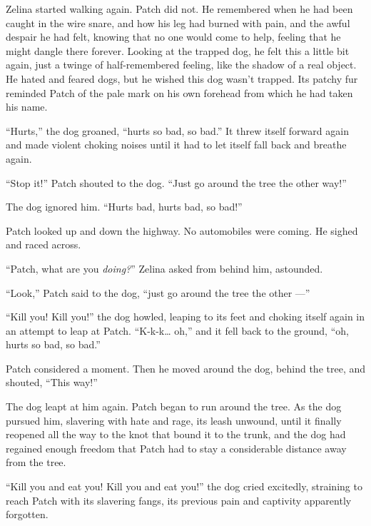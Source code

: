 \documentclass[ebook,oneside,openany,17pt]{memoir}
\newenvironment{tolerant}[1]{%
  \par\tolerance=#1\relax
}{%
  \par
}
\begin{document}
\begin{tolerant}{1000}
Zelina started walking again. Patch did not. He remembered when he had
been caught in the wire snare, and how his leg had burned with pain,
and the awful despair he had felt, knowing that no one would come to
help, feeling that he might dangle there forever. Looking at the
trapped dog, he felt this a little bit again, just a twinge of
half-remembered feeling, like the shadow of a real object. He hated
and feared dogs, but he wished this dog wasn’t trap\-ped. Its patchy fur
reminded Patch of the pale mark on his own forehead from which he had
taken his name.
\end{tolerant}

\begin{tolerant}{1000}
“Hurts,” the dog groaned, “hurts so bad, so bad.” It threw itself
forward again and made violent choking noises until it had to let
itself fall back and breathe again.
\end{tolerant}

\begin{tolerant}{1000}
“Stop it!” Patch shouted to the dog. “Just go around the tree the
other way!”
\end{tolerant}

The dog ignored him. “Hurts bad, hurts bad, so bad!”

Patch looked up and down the highway. No automobiles were coming. He
sighed and raced across.

“Patch, what are you \emph{doing?}” Zelina asked from behind him,
astounded.

“Look,” Patch said to the dog, “just go around the tree the other —”

“Kill you! Kill you!” the dog howled, leaping to its feet and choking
itself again in an attempt to leap at Patch. “K-k-k… oh,” and it fell
back to the ground, “oh, hurts so bad, so bad.”

\begin{tolerant}{2000}
Patch considered a moment. Then he moved around the dog, behind the
tree, and shouted, “This way!”
\end{tolerant}

The dog leapt at him again. Patch began to run around the tree. As the
dog pursued him, slavering with hate and rage, its leash unwound,
until it finally reopened all the way to the knot that bound it to the
trunk, and the dog had regained enough freedom that Patch had to stay
a considerable distance away from the tree.

“Kill you and eat you! Kill you and eat you!” the dog cried excitedly,
straining to reach Patch with its slavering fangs, its previous pain
and captivity apparently forgotten.
\end{document}
